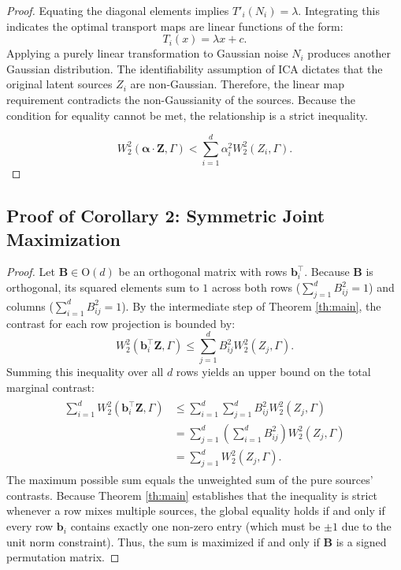 \documentclass[accepted]{tpm2026} %
\begin{document}
\begin{proof}
Equating the diagonal elements implies $T'_i(N_i) = \lambda$. Integrating this indicates the optimal transport maps are linear functions of the form:
\begin{equation}
    T_i(x) = \lambda x + c.
\end{equation}
Applying a purely linear transformation to Gaussian noise $N_i$ produces another Gaussian distribution. 
The identifiability assumption of ICA dictates that the original latent sources $Z_i$ are non-Gaussian. 
Therefore, the linear map requirement contradicts the non-Gaussianity of the sources. 
Because the condition for equality cannot be met, the relationship is a strict inequality. 

\begin{equation}
    W_2^2(\mathbf{\alpha} \cdot \mathbf{Z}, \Gamma) < \sum_{i=1}^d \alpha_i^2 W_2^2(Z_i, \Gamma).
\end{equation}
\end{proof}

\subsection{Proof of Corollary 2: Symmetric Joint Maximization}

\begin{proof}
Let $\mathbf{B} \in \mathrm{O}(d)$ be an orthogonal matrix with rows $\mathbf{b}_i^\top$. Because $\mathbf{B}$ is orthogonal, its squared elements sum to $1$ across both rows ($\sum_{j=1}^d B_{ij}^2 = 1$) and columns ($\sum_{i=1}^d B_{ij}^2 = 1$).
By the intermediate step of Theorem \ref{th:main}, the contrast for each row projection is bounded by:
\begin{equation}
    W_2^2(\mathbf{b}_i^\top \mathbf{Z}, \Gamma) \le \sum_{j=1}^d B_{ij}^2 W_2^2(Z_j, \Gamma).
\end{equation}
Summing this inequality over all $d$ rows yields an upper bound on the total marginal contrast:
\begin{align}\begin{split}
    \sum_{i=1}^d W_2^2(\mathbf{b}_i^\top \mathbf{Z}, \Gamma) &\le \sum_{i=1}^d \sum_{j=1}^d B_{ij}^2 W_2^2(Z_j, \Gamma) \\
    &= \sum_{j=1}^d \left( \sum_{i=1}^d B_{ij}^2 \right) W_2^2(Z_j, \Gamma) \\
    &= \sum_{j=1}^d W_2^2(Z_j, \Gamma).
    \end{split}
\end{align}
The maximum possible sum equals the unweighted sum of the pure sources' contrasts. Because Theorem \ref{th:main} establishes that the inequality is strict whenever a row mixes multiple sources, the global equality holds if and only if every row $\mathbf{b}_i$ contains exactly one non-zero entry (which must be $\pm 1$ due to the unit norm constraint). Thus, the sum is maximized if and only if $\mathbf{B}$ is a signed permutation matrix.
\end{proof}
\end{document}
